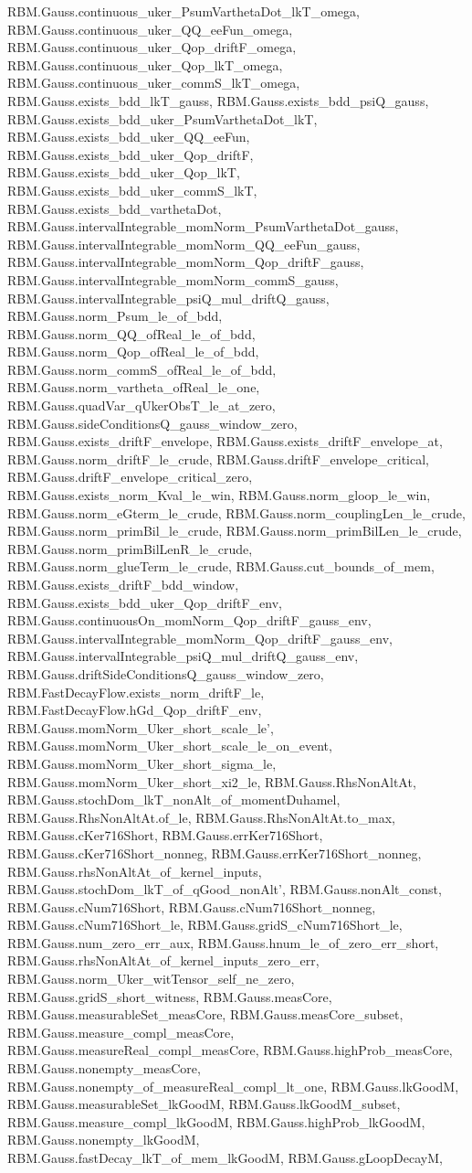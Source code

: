 \begin{theorem}
RBM.Gauss.continuous_uker_PsumVarthetaDot_lkT_omega, RBM.Gauss.continuous_uker_QQ_eeFun_omega, RBM.Gauss.continuous_uker_Qop_driftF_omega, RBM.Gauss.continuous_uker_Qop_lkT_omega, RBM.Gauss.continuous_uker_commS_lkT_omega, RBM.Gauss.exists_bdd_lkT_gauss, RBM.Gauss.exists_bdd_psiQ_gauss, RBM.Gauss.exists_bdd_uker_PsumVarthetaDot_lkT, RBM.Gauss.exists_bdd_uker_QQ_eeFun, RBM.Gauss.exists_bdd_uker_Qop_driftF, RBM.Gauss.exists_bdd_uker_Qop_lkT, RBM.Gauss.exists_bdd_uker_commS_lkT, RBM.Gauss.exists_bdd_varthetaDot, RBM.Gauss.intervalIntegrable_momNorm_PsumVarthetaDot_gauss, RBM.Gauss.intervalIntegrable_momNorm_QQ_eeFun_gauss, RBM.Gauss.intervalIntegrable_momNorm_Qop_driftF_gauss, RBM.Gauss.intervalIntegrable_momNorm_commS_gauss, RBM.Gauss.intervalIntegrable_psiQ_mul_driftQ_gauss, RBM.Gauss.norm_Psum_le_of_bdd, RBM.Gauss.norm_QQ_ofReal_le_of_bdd, RBM.Gauss.norm_Qop_ofReal_le_of_bdd, RBM.Gauss.norm_commS_ofReal_le_of_bdd, RBM.Gauss.norm_vartheta_ofReal_le_one, RBM.Gauss.quadVar_qUkerObsT_le_at_zero, RBM.Gauss.sideConditionsQ_gauss_window_zero, RBM.Gauss.exists_driftF_envelope, RBM.Gauss.exists_driftF_envelope_at, RBM.Gauss.norm_driftF_le_crude, RBM.Gauss.driftF_envelope_critical, RBM.Gauss.driftF_envelope_critical_zero, RBM.Gauss.exists_norm_Kval_le_win, RBM.Gauss.norm_gloop_le_win, RBM.Gauss.norm_eGterm_le_crude, RBM.Gauss.norm_couplingLen_le_crude, RBM.Gauss.norm_primBil_le_crude, RBM.Gauss.norm_primBilLen_le_crude, RBM.Gauss.norm_primBilLenR_le_crude, RBM.Gauss.norm_glueTerm_le_crude, RBM.Gauss.cut_bounds_of_mem, RBM.Gauss.exists_driftF_bdd_window, RBM.Gauss.exists_bdd_uker_Qop_driftF_env, RBM.Gauss.continuousOn_momNorm_Qop_driftF_gauss_env, RBM.Gauss.intervalIntegrable_momNorm_Qop_driftF_gauss_env, RBM.Gauss.intervalIntegrable_psiQ_mul_driftQ_gauss_env, RBM.Gauss.driftSideConditionsQ_gauss_window_zero, RBM.FastDecayFlow.exists_norm_driftF_le, RBM.FastDecayFlow.hGd_Qop_driftF_env, RBM.Gauss.momNorm_Uker_short_scale_le', RBM.Gauss.momNorm_Uker_short_scale_le_on_event, RBM.Gauss.momNorm_Uker_short_sigma_le, RBM.Gauss.momNorm_Uker_short_xi2_le, RBM.Gauss.RhsNonAltAt, RBM.Gauss.stochDom_lkT_nonAlt_of_momentDuhamel, RBM.Gauss.RhsNonAltAt.of_le, RBM.Gauss.RhsNonAltAt.to_max, RBM.Gauss.cKer716Short, RBM.Gauss.errKer716Short, RBM.Gauss.cKer716Short_nonneg, RBM.Gauss.errKer716Short_nonneg, RBM.Gauss.rhsNonAltAt_of_kernel_inputs, RBM.Gauss.stochDom_lkT_of_qGood_nonAlt', RBM.Gauss.nonAlt_const, RBM.Gauss.cNum716Short, RBM.Gauss.cNum716Short_nonneg, RBM.Gauss.cNum716Short_le, RBM.Gauss.gridS_cNum716Short_le, RBM.Gauss.num_zero_err_aux, RBM.Gauss.hnum_le_of_zero_err_short, RBM.Gauss.rhsNonAltAt_of_kernel_inputs_zero_err, RBM.Gauss.norm_Uker_witTensor_self_ne_zero, RBM.Gauss.gridS_short_witness, RBM.Gauss.measCore, RBM.Gauss.measurableSet_measCore, RBM.Gauss.measCore_subset, RBM.Gauss.measure_compl_measCore, RBM.Gauss.measureReal_compl_measCore, RBM.Gauss.highProb_measCore, RBM.Gauss.nonempty_measCore, RBM.Gauss.nonempty_of_measureReal_compl_lt_one, RBM.Gauss.lkGoodM, RBM.Gauss.measurableSet_lkGoodM, RBM.Gauss.lkGoodM_subset, RBM.Gauss.measure_compl_lkGoodM, RBM.Gauss.highProb_lkGoodM, RBM.Gauss.nonempty_lkGoodM, RBM.Gauss.fastDecay_lkT_of_mem_lkGoodM, RBM.Gauss.gLoopDecayM, 
\end{theorem}
